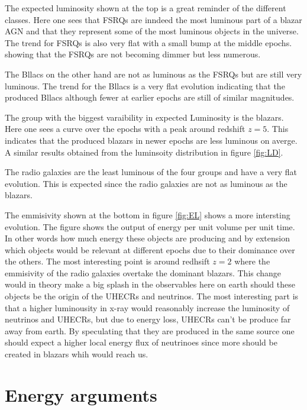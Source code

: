 \documentclass{article}
\begin{document}
The expected luminosity shown at the top is a great reminder of the different classes. Here one sees that FSRQs are inndeed the most luminous part of a blazar AGN and 
that they represent some of the most luminous objects in the universe. The trend for FSRQs is also very flat with a small bump at the middle epochs. showing that the FSRQs are not becoming dimmer but less numerous.

The Bllacs on the other hand are not as luminous as the FSRQs but are still very luminous. 
The trend for the Bllacs is a very flat evolution indicating that the produced Bllacs although fewer at earlier epochs are still 
of similar magnitudes.

The group with the biggest varaibility in expected Luminosity is the blazars. Here one sees a curve over the epochs with a peak around redshift $z=5$. 
This indicates that the produced blazars in newer epochs are less luminous on averge. A similar results obtained from the luminsoity distribution in figure \ref{fig:LD}.

The radio galaxies are the least luminous of the four groups and have a very flat evolution. This is expected since the radio galaxies are not as luminous as the blazars.

The emmisivity shown at the bottom in figure \ref{fig:EL} shows a more intersting evolution. The figure shows the output of energy per unit volume per unit time. In other words 
how much energy these objects are producing and by extension which objects would be relevant at different epochs due to their dominance over the others.
The most interesting point is around redhsift $z=2$ where the emmisivity of the radio galaxies overtake the dominant blazars. This change would in theory make
a big splash in the observables here on earth should these objects be the origin of the UHECRs and neutrinos. The most interesting part is that a higher luminousity in x-ray would 
reasonably increase the luminosity of neutrinos and UHECRs, but due to energy loss, UHECRs can't be produce far away from earth. By speculating that they are produced in the same source one should expect a 
higher local energy flux of neutrinoes since more should be created in blazars whih would reach us. 


\section{Energy arguments}
\end{document}
